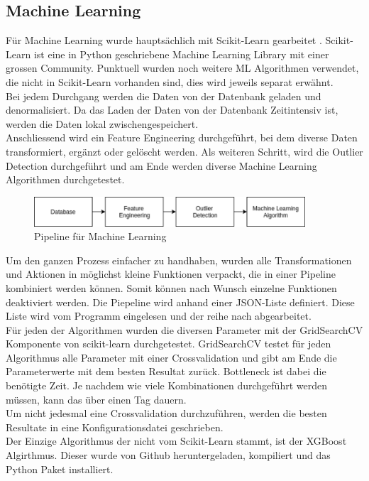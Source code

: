 \subsection{Machine Learning}
Für Machine Learning wurde hauptsächlich mit Scikit-Learn gearbeitet \cite{scikit}. Scikit-Learn ist eine in Python geschriebene Machine Learning Library mit einer grossen Community. Punktuell wurden noch weitere ML Algorithmen verwendet, die nicht in Scikit-Learn vorhanden sind, dies wird jeweils separat erwähnt.\\[2ex]
%
Bei jedem Durchgang werden die Daten von der Datenbank geladen und denormalisiert. Da das Laden der Daten von der Datenbank Zeitintensiv ist, werden die Daten lokal zwischengespeichert.\\
Anschliessend wird ein Feature Engineering durchgeführt, bei dem diverse Daten transformiert, ergänzt oder gelöscht werden. Als weiteren Schritt, wird die Outlier Detection durchgeführt und am Ende werden diverse Machine Learning Algorithmen durchgetestet.\\[2ex]
%
\begin{figure}[h!]
\centering
\includegraphics[width=0.9\textwidth]{images/machine_learning_pipeline.png}
\caption[Pipeline für Machine Learning]{Pipeline für Machine Learning}%
\label{fig:ml_pipeline}
\end{figure}
\newline
%
Um den ganzen Prozess einfacher zu handhaben, wurden alle Transformationen und Aktionen in möglichst kleine Funktionen verpackt, die in einer Pipeline kombiniert werden können. Somit können nach Wunsch einzelne Funktionen deaktiviert werden. Die Piepeline wird anhand einer JSON-Liste definiert. Diese Liste wird vom Programm eingelesen und der reihe nach abgearbeitet.\\[2ex]
%
Für jeden der Algorithmen wurden die diversen Parameter mit der GridSearchCV Komponente von scikit-learn durchgetestet. GridSearchCV testet für jeden Algorithmus alle Parameter mit einer Crossvalidation und gibt am Ende die Parameterwerte mit dem besten Resultat zurück. Bottleneck ist dabei die benötigte Zeit. Je nachdem wie viele Kombinationen durchgeführt werden müssen, kann das über einen Tag dauern.\\
Um nicht jedesmal eine Crossvalidation durchzuführen, werden die besten Resultate in eine Konfigurationsdatei geschrieben.\\
Der Einzige Algorithmus der nicht vom Scikit-Learn stammt, ist der XGBoost Algirthmus. Dieser wurde von Github heruntergeladen, kompiliert und das Python Paket installiert.
%
%
